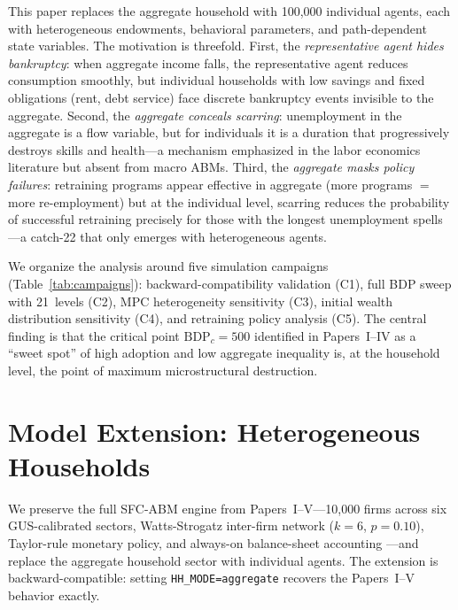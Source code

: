 \documentclass[12pt,a4paper]{article}
\begin{document}
This paper replaces the aggregate household with 100,000 individual
agents, each with heterogeneous endowments, behavioral parameters, and
path-dependent state variables. The motivation is threefold. First, the
\emph{representative agent hides bankruptcy}: when aggregate income
falls, the representative agent reduces consumption smoothly, but
individual households with low savings and fixed obligations (rent, debt
service) face discrete bankruptcy events invisible to the aggregate.
Second, the \emph{aggregate conceals scarring}: unemployment in the
aggregate is a flow variable, but for individuals it is a duration that
progressively destroys skills and health---a mechanism emphasized in the
labor economics literature \parencite{arulampalam2001, jacobson1993,
blanchard1986} but absent from macro ABMs. Third, the \emph{aggregate
masks policy failures}: retraining programs appear effective in aggregate
(more programs $=$ more re-employment) but at the individual level,
scarring reduces the probability of successful retraining precisely for
those with the longest unemployment spells---a catch-22 that only
emerges with heterogeneous agents.

We organize the analysis around five simulation campaigns
(Table~\ref{tab:campaigns}): backward-compatibility validation (C1),
full BDP sweep with 21~levels (C2), MPC heterogeneity sensitivity (C3),
initial wealth distribution sensitivity (C4), and retraining policy
analysis (C5). The central finding is that the critical point
$\mathrm{BDP}_c = 500$ identified in Papers~I--IV as a ``sweet spot''
of high adoption and low aggregate inequality is, at the household level,
the point of maximum microstructural destruction.

\section{Model Extension: Heterogeneous Households}
\label{sec:model}

We preserve the full SFC-ABM engine from Papers~I--V---10,000 firms
across six GUS-calibrated sectors, Watts-Strogatz inter-firm network
($k = 6$, $p = 0.10$), Taylor-rule monetary policy, and always-on
balance-sheet accounting \parencite{godley2007}---and replace the
aggregate household sector with individual agents. The extension is
backward-compatible: setting \texttt{HH\_MODE=aggregate} recovers the
Papers~I--V behavior exactly.
\end{document}
